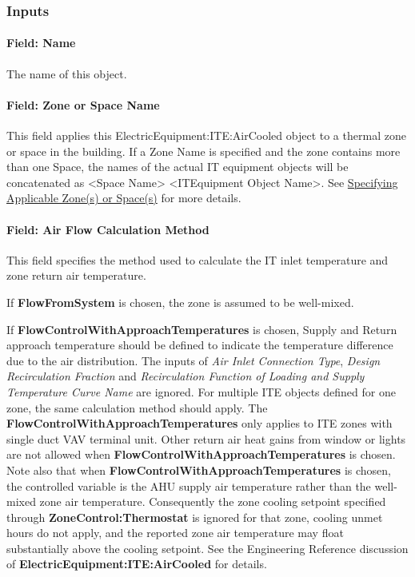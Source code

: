 \subsubsection{Inputs}\label{inputs-9-009}

\paragraph{Field: Name}\label{field-name-9-008}

The name of this object.

\paragraph{Field: Zone or Space Name}\label{iteq-field-zone-or-space-name-000}

This field applies this ElectricEquipment:ITE:AirCooled object to a thermal zone or space in the building. If a Zone Name is specified and the zone contains more than one Space, the names of the actual IT equipment objects will be concatenated as \textless{}Space Name\textgreater{} \textless{}ITEquipment Object Name\textgreater{}. See \hyperref[specifying-applicable-zones-or-spaces]{Specifying Applicable Zone(s) or Space(s)} for more details.

\paragraph{Field: Air Flow Calculation Method}\label{field-air-flow-calculation-method}

This field specifies the method used to calculate the IT inlet temperature and zone return air temperature.

If \textbf{FlowFromSystem} is chosen, the zone is assumed to be well-mixed.

If \textbf{FlowControlWithApproachTemperatures} is chosen, Supply and Return approach temperature should be defined to indicate the temperature difference due to the air distribution. The inputs of \textit{Air Inlet Connection Type}, \textit{Design Recirculation Fraction} and \textit{Recirculation Function of Loading and Supply Temperature Curve Name} are ignored. For multiple ITE objects defined for one zone, the same calculation method should apply. The \textbf{FlowControlWithApproachTemperatures} only applies to ITE zones with single duct VAV terminal unit. Other return air heat gains from window or lights are not allowed when \textbf{FlowControlWithApproachTemperatures} is chosen. Note also that when \textbf{FlowControlWithApproachTemperatures} is chosen, the controlled variable is the AHU supply air temperature rather than the well-mixed zone air temperature. Consequently the zone cooling setpoint specified through \textbf{ZoneControl:Thermostat} is ignored for that zone, cooling unmet hours do not apply, and the reported zone air temperature may float substantially above the cooling setpoint. See the Engineering Reference discussion of \textbf{ElectricEquipment:ITE:AirCooled} for details.

